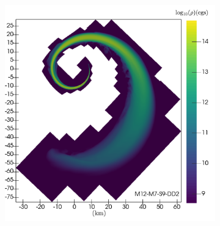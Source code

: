 %	
%
%	
%
%	



\begin{figure}
	\centering
	\begin{subfigure}[b]{0.475\textwidth}
		\centering
		\includegraphics[width=1.0\linewidth]{images/rho_DD2_M12-merger-inertial}
		\label{fig:rho_M12_DD2}
	\end{subfigure}
	\begin{subfigure}[b]{0.475\textwidth}
		\centering

\end{subfigure}
\end{figure}

